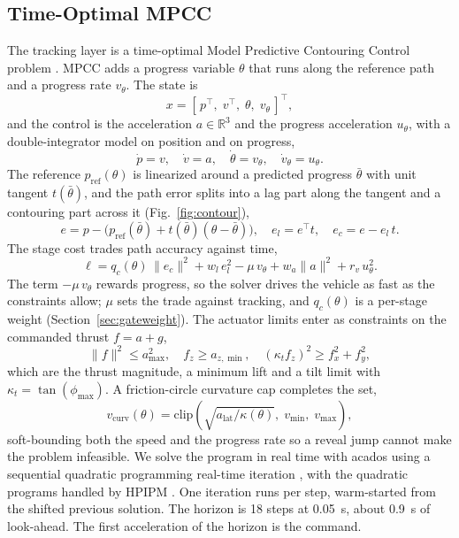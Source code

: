 \documentclass[conference]{IEEEtran}
\begin{document}
\subsection{Time-Optimal MPCC}
\label{sec:mpcc}
The tracking layer is a time-optimal Model Predictive Contouring Control problem \cite{mpcc,lam}. MPCC adds a progress variable $\theta$ that runs along the reference path and a progress rate $v_\theta$. The state is
\begin{equation}
x = [\, p^\top,\; v^\top,\; \theta,\; v_\theta \,]^\top,
\end{equation}
and the control is the acceleration $a \in \mathbb{R}^3$ and the progress acceleration $u_\theta$, with a double-integrator model on position and on progress,
\begin{equation}
\dot p = v,\quad \dot v = a,\quad \dot\theta = v_\theta,\quad \dot v_\theta = u_\theta .
\end{equation}
The reference $p_{\text{ref}}(\theta)$ is linearized around a predicted progress $\bar\theta$ with unit tangent $t(\bar\theta)$, and the path error splits into a lag part along the tangent and a contouring part across it (Fig.~\ref{fig:contour}),
\begin{equation}
e = p - \big(p_{\text{ref}}(\bar\theta) + t(\bar\theta)(\theta-\bar\theta)\big),\quad e_l = e^\top t,\quad e_c = e - e_l\,t .
\end{equation}
The stage cost trades path accuracy against time,
\begin{equation}
\ell = q_c(\theta)\,\lVert e_c \rVert^2 + w_l\, e_l^2 - \mu\, v_\theta + w_a \lVert a \rVert^2 + r_v\, u_\theta^2 .
\label{eq:cost}
\end{equation}
The term $-\mu\, v_\theta$ rewards progress, so the solver drives the vehicle as fast as the constraints allow; $\mu$ sets the trade against tracking, and $q_c(\theta)$ is a per-stage weight (Section~\ref{sec:gateweight}). The actuator limits enter as constraints on the commanded thrust $f = a + g$,
\begin{equation}
\lVert f \rVert^2 \le a_{\max}^2, \quad f_z \ge a_{z,\min}, \quad (\kappa_t f_z)^2 \ge f_x^2 + f_y^2,
\end{equation}
which are the thrust magnitude, a minimum lift and a tilt limit with $\kappa_t = \tan(\phi_{\max})$. A friction-circle curvature cap completes the set,
\begin{equation}
v_{\text{curv}}(\theta) = \mathrm{clip}\!\left(\sqrt{a_{\text{lat}}/\kappa(\theta)},\; v_{\min},\; v_{\max}\right),
\label{eq:curv}
\end{equation}
soft-bounding both the speed and the progress rate so a reveal jump cannot make the problem infeasible. We solve the program in real time with acados \cite{acados} using a sequential quadratic programming real-time iteration \cite{rti}, with the quadratic programs handled by HPIPM \cite{hpipm}. One iteration runs per step, warm-started from the shifted previous solution. The horizon is 18 steps at 0.05~s, about 0.9~s of look-ahead. The first acceleration of the horizon is the command.
\end{document}
